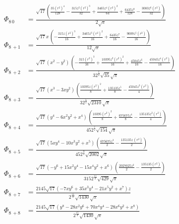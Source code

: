 \documentclass[10pt]{article}
\begin{document}
\begin{align*}
\Phi_{8\, 0} &= \frac{\sqrt{17} \left( \frac{35 {{\left( r^2\right) }^{4}}}{128}-\frac{315 {{z}^{2}} {{\left( r^2\right) }^{3}}}{32}+\frac{3465 {{z}^{4}} {{\left( r^2\right) }^{2}}}{64}+\frac{6435 {{z}^{8}}}{128}-\frac{3003 {{z}^{6}} \left( r^2\right) }{32}\right) }{2 \sqrt{\ensuremath{\pi} }} \\
\Phi_{8\, +1} &= \frac{\sqrt{17} x\, \left( -\frac{315 z {{\left( r^2\right) }^{3}}}{16}+\frac{3465 {{z}^{3}} {{\left( r^2\right) }^{2}}}{16}+\frac{6435 {{z}^{7}}}{16}-\frac{9009 {{z}^{5}} \left( r^2\right) }{16}\right) }{12 \sqrt{\ensuremath{\pi} }} \\
\Phi_{8\, +2} &= \frac{\sqrt{17} \left( {{x}^{2}}-{{y}^{2}}\right) \, \left( -\frac{315 {{\left( r^2\right) }^{3}}}{16}+\frac{10395 {{z}^{2}} {{\left( r^2\right) }^{2}}}{16}+\frac{45045 {{z}^{6}}}{16}-\frac{45045 {{z}^{4}} \left( r^2\right) }{16}\right) }{3 {{2}^{\frac{5}{2}}} \sqrt{35} \sqrt{\ensuremath{\pi} }} \\
\Phi_{8\, +3} &= \frac{\sqrt{17} \left( {{x}^{3}}-3 x {{y}^{2}}\right) \, \left( \frac{10395 z {{\left( r^2\right) }^{2}}}{8}+\frac{135135 {{z}^{5}}}{8}-\frac{45045 {{z}^{3}} \left( r^2\right) }{4}\right) }{3 {{2}^{\frac{5}{2}}} \sqrt{2310} \sqrt{\ensuremath{\pi} }} \\
\Phi_{8\, +4} &= \frac{\sqrt{17} \left( {{y}^{4}}-6 {{x}^{2}} {{y}^{2}}+{{x}^{4}}\right) \, \left( \frac{10395 {{\left( r^2\right) }^{2}}}{8}+\frac{675675 {{z}^{4}}}{8}-\frac{135135 {{z}^{2}} \left( r^2\right) }{4}\right) }{45 {{2}^{\frac{7}{2}}} \sqrt{154} \sqrt{\ensuremath{\pi} }} \\
\Phi_{8\, +5} &= \frac{\sqrt{17} \left( 5 x {{y}^{4}}-10 {{x}^{3}} {{y}^{2}}+{{x}^{5}}\right) \, \left( \frac{675675 {{z}^{3}}}{2}-\frac{135135 z\, \left( r^2\right) }{2}\right) }{45 {{2}^{\frac{9}{2}}} \sqrt{2002} \sqrt{\ensuremath{\pi} }} \\
\Phi_{8\, +6} &= \frac{\sqrt{17} \left( -{{y}^{6}}+15 {{x}^{2}} {{y}^{4}}-15 {{x}^{4}} {{y}^{2}}+{{x}^{6}}\right) \, \left( \frac{2027025 {{z}^{2}}}{2}-\frac{135135 \left( r^2\right) }{2}\right) }{315 {{2}^{\frac{11}{2}}} \sqrt{429} \sqrt{\ensuremath{\pi} }} \\
\Phi_{8\, +7} &= \frac{2145 \sqrt{17} \left( -7 x {{y}^{6}}+35 {{x}^{3}} {{y}^{4}}-21 {{x}^{5}} {{y}^{2}}+{{x}^{7}}\right)  z}{{{2}^{\frac{11}{2}}} \sqrt{1430} \sqrt{\ensuremath{\pi} }} \\
\Phi_{8\, +8} &= \frac{2145 \sqrt{17} \left( {{y}^{8}}-28 {{x}^{2}} {{y}^{6}}+70 {{x}^{4}} {{y}^{4}}-28 {{x}^{6}} {{y}^{2}}+{{x}^{8}}\right) }{{{2}^{\frac{15}{2}}} \sqrt{1430} \sqrt{\ensuremath{\pi} }} \\

\end{align*}
\end{document}
